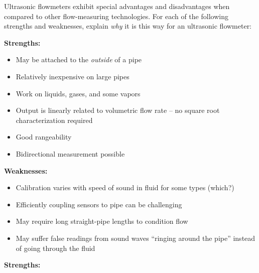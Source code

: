 

Ultrasonic flowmeters exhibit special advantages and disadvantages when compared to other flow-measuring technologies.  For each of the following strengths and weaknesses, explain {\it why} it is this way for an ultrasonic flowmeter:

\vskip 10pt

{\bf Strengths:}

\begin{itemize}
\item{} May be attached to the {\it outside} of a pipe
\item{} Relatively inexpensive on large pipes
\item{} Work on liquids, gases, and some vapors
\item{} Output is linearly related to volumetric flow rate -- no square root characterization required
\item{} Good rangeability
\item{} Bidirectional measurement possible
\end{itemize}

\vskip 10pt

{\bf Weaknesses:}

\begin{itemize}
\item{} Calibration varies with speed of sound in fluid for some types (which?)
\item{} Efficiently coupling sensors to pipe can be challenging
\item{} May require long straight-pipe lengths to condition flow
\item{} May suffer false readings from sound waves ``ringing around the pipe'' instead of going through the fluid
\end{itemize}














{\bf Strengths:}

